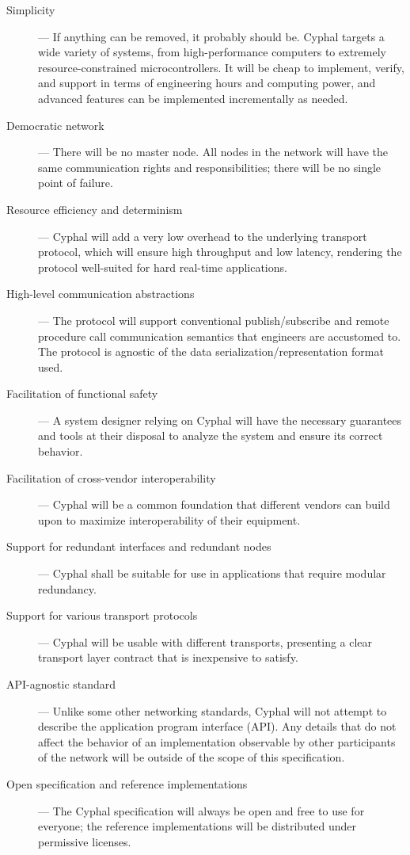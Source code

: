 \begin{description}
    \item[Simplicity] --- If anything can be removed, it probably should be. Cyphal targets a wide variety of systems,
    from high-performance computers to extremely resource-constrained microcontrollers.
    It will be cheap to implement, verify, and support in terms of engineering hours and computing power,
    and advanced features can be implemented incrementally as needed.

    \item[Democratic network] --- There will be no master node.
    All nodes in the network will have the same communication rights and responsibilities;
    there will be no single point of failure.

    \item[Resource efficiency and determinism] --- Cyphal will add a very low overhead to the underlying
    transport protocol, which will ensure high throughput and low latency, rendering the protocol well-suited
    for hard real-time applications.

    \item[High-level communication abstractions] --- The protocol will support conventional publish/subscribe
    and remote procedure call communication semantics that engineers are accustomed to.
    The protocol is agnostic of the data serialization/representation format used.

    \item[Facilitation of functional safety] --- A system designer relying on Cyphal will have the necessary
    guarantees and tools at their disposal to analyze the system and ensure its correct behavior.

    \item[Facilitation of cross-vendor interoperability] --- Cyphal will be a common foundation that
    different vendors can build upon to maximize interoperability of their equipment.

    \item[Support for redundant interfaces and redundant nodes] --- Cyphal shall be suitable for use in
    applications that require modular redundancy.

    \item[Support for various transport protocols] --- Cyphal will be usable with different transports,
    presenting a clear transport layer contract that is inexpensive to satisfy.

    \item[API-agnostic standard] --- Unlike some other networking standards, Cyphal will not attempt to describe
    the application program interface (API). Any details that do not affect the behavior of an implementation
    observable by other participants of the network will be outside of the scope of this specification.

    \item[Open specification and reference implementations] --- The Cyphal specification will always be open and
    free to use for everyone; the reference implementations will be distributed under permissive licenses.
\end{description}

